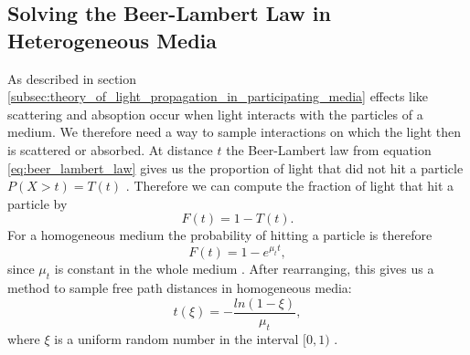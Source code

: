 \subsection{Solving the Beer-Lambert Law in Heterogeneous Media}
\label{subsec:solving_beer_lambert_law_in_heterogeneous_media}
As described in section \ref{subsec:theory_of_light_propagation_in_participating_media} effects like scattering and absoption occur when light interacts with the particles of a medium.
We therefore need a way to sample interactions on which the light then is scattered or absorbed.
At distance $t$ the Beer-Lambert law from equation \ref{eq:beer_lambert_law} gives us the proportion of light that did not hit a particle $P(X > t) = T(t)$ \cite{novak_overview}.
Therefore we can compute the fraction of light that hit a particle by \cite{novak_overview}
\begin{equation*}
    F(t) = 1 - T(t).
\end{equation*}
For a homogeneous medium the probability of hitting a particle is therefore
\begin{equation*}
    F(t) = 1 - e^{\mu_t t},
\end{equation*}
since $\mu_t$ is constant in the whole medium \cite{novak_overview}.
After rearranging, this gives us a method to sample free path distances in homogeneous media:
\begin{equation}
    \label{eq:distance_sampling}
    t(\xi) = -\frac{ln(1-\xi)}{\mu_t},
\end{equation}
where $\xi$ is a uniform random number in the interval $[0, 1)$ \cite{novak_overview}.

